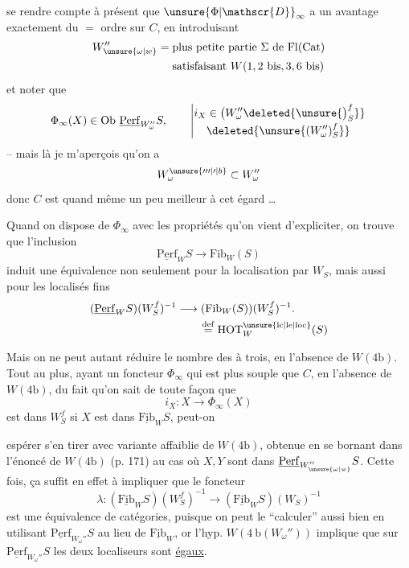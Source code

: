 se rendre compte à présent que $\unsure{\Phi|\mathscr{D}}_\infty$ a un avantage exactement du $=$ ordre sur $C$, en introduisant
\[
\begin{aligned}
W_{\unsure{\omega|w}}''={}&\text{plus petite partie }\Sigma\text{ de }\mathrm{Fl}(\mathrm{Cat})\\
&\text{satisfaisant }W(1,2\ \mathrm{bis},3,6\ \mathrm{bis})
\end{aligned}
\]
et noter que
\[
\Phi_\infty(X)\in\mathrm{Ob}\ \underline{\mathrm{Perf}}_{W_\omega''}S,\qquad
\left|\begin{aligned}
i_X&\in\bigl(W_\omega''\deleted{\unsure{\bigr)_S^f}}\bigr.\\[-2pt]
&\deleted{\unsure{(W_\omega'')_S^f}}
\end{aligned}\right.
\]
-- mais là je m'aperçois qu'on a
\[
W_\omega^{\unsure{\prime\prime\prime|\prime|b}}\subset W_\omega''
\]
donc $C$ est quand même un peu meilleur à cet égard \ldots

Quand on dispose de $\Phi_\infty$ avec les propriétés qu'on vient d'expliciter, on trouve que  l'inclusion
\[
\underline{\mathrm{Perf}}_W S\to\mathrm{Fib}_W(S)
\]
induit une équivalence non seulement pour la localisation par $W_S$, mais aussi pour les localisés fins
\[
\begin{aligned}
(\underline{\mathrm{Perf}}_W S)(W_S^f)^{-1}&\longrightarrow(\mathrm{Fib}_W(S))(W_S^f)^{-1}.\\
&\qquad\overset{\mathrm{def}}{=}\mathrm{HOT}_W^{\unsure{\mathrm{lc}|\mathrm{le}|\mathrm{loc}}}(S)
\end{aligned}
\]

Mais on ne peut  autant réduire le nombre des   à trois, en l'absence de $W(4\mathrm b)$. Tout au plus, ayant un foncteur $\Phi_\infty$ qui est plus souple que $C$, en l'absence de $W(4\mathrm b)$, du fait qu'on sait de toute façon que
\[
i_X:X\longrightarrow\Phi_\infty(X)
\]
est dans $W_S^f$ si $X$ est dans $\underline{\mathrm{Fib}}_W S$, peut-on

espérer s'en tirer avec  variante affaiblie de $W(4\mathrm b)$, obtenue en se bornant dans l'énoncé de $W(4\mathrm b)$ (p. 171) au cas où $X,Y$ sont dans $\underline{\mathrm{Perf}}_{W_{\unsure{\omega|w}}''}S$. Cette fois, ça suffit en effet à impliquer que le foncteur
\[
\lambda:(\underline{\mathrm{Fib}}_W S)(W_S^f)^{-1}\to(\underline{\mathrm{Fib}}_W S)(W_S)^{-1}
\]
est une équivalence de catégories, puisque on peut le ``calculer'' aussi bien en utilisant $\underline{\mathrm{Perf}}_{W_\omega''}S$ au lieu de $\underline{\mathrm{Fib}}_W$, or  l'hyp. $W(4\ \mathrm b(W_\omega''))$ implique que sur $\underline{\mathrm{Perf}}_{W_\omega''}S$ les deux localiseurs  sont \uline{égaux}.

